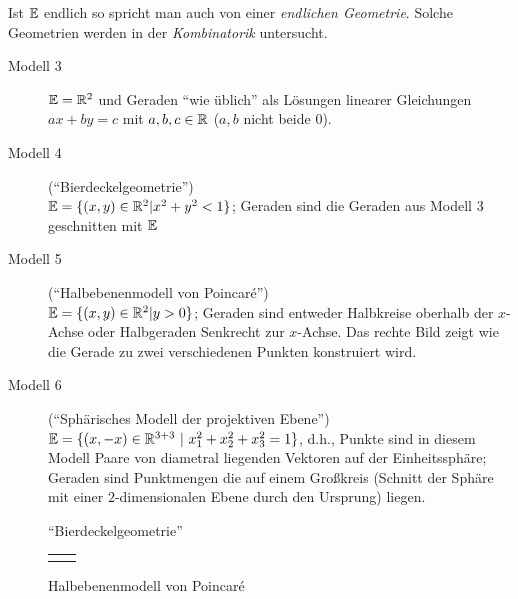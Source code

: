 Ist $\mathbb E$ endlich so spricht man auch von einer {\em endlichen Geometrie}.  Solche Geometrien werden
in der {\em Kombinatorik} untersucht.

\begin{description}
    \item[Modell 3] $\mathbb E=\mathbb R^2$ und Geraden "`wie üblich"' als Lösungen linearer Gleichungen
        $a x + b y = c$ mit $a,b,c\in \mathbb R$ ($a,b$ nicht beide $0$).

    \item[Modell 4] ("`Bierdeckelgeometrie"')\\ %
        $\mathbb E=\{ (x,y)\in\mathbb R^2 | x^2+y^2<1 \}$; Geraden sind die Geraden aus Modell 3 geschnitten mit
        $\mathbb E$

    \item[Modell 5] ("`Halbebenenmodell von Poincaré"')\\
        $\mathbb E=\{ (x,y)\in\mathbb R^2 | y>0 \}$; Geraden sind entweder Halbkreise oberhalb der $x$-Achse oder
        Halbgeraden Senkrecht zur $x$-Achse. Das rechte Bild zeigt wie die Gerade zu zwei
        verschiedenen Punkten konstruiert wird.

    \item[Modell 6] ("`Sphärisches Modell der projektiven Ebene"')\\
        $\mathbb E=\{ (x,-x)\in\mathbb R^{3+3} \ | \ x_1^2+  x_2^2 + x_3^2= 1 \}$, d.h., Punkte sind in diesem
        Modell Paare von diametral liegenden Vektoren auf der Einheitssphäre; Geraden sind
        Punktmengen die auf einem Großkreis (Schnitt der Sphäre mit einer $2$-dimensionalen Ebene
        durch den Ursprung) liegen.
\end{description}

\begin{figure}[ht]
    
    \caption{"`Bierdeckelgeometrie"'}
\end{figure}

\begin{figure}[ht]
    \begin{tabular}{cc}
        
        &
        
    \end{tabular}
    \caption{Halbebenenmodell von Poincaré}
\end{figure}


